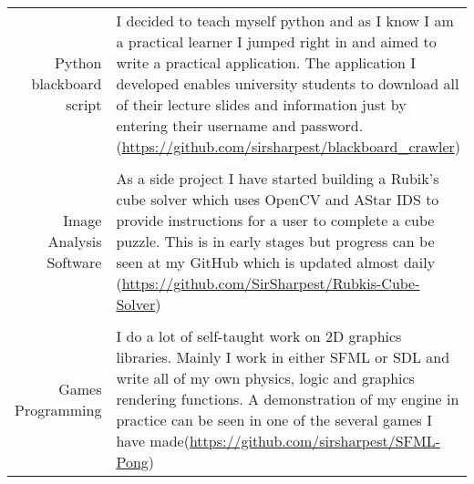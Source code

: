 \documentclass[a4paper,10pt]{article}
\begin{document}
\begin{tabular}{r|p{11cm}}
Python blackboard script& I decided to teach myself python and as I know I am a practical learner I jumped right in and aimed to write a practical application. The application I developed enables university students to download all of their lecture slides and information just by entering their username and password.(\href{https://github.com/sirsharpest/blackboard\_crawler}{https://github.com/sirsharpest/blackboard\_crawler})\\
\\
 Image Analysis Software& As a side project I have started building a Rubik's cube solver which uses OpenCV and AStar IDS to provide instructions for a user to complete a cube puzzle. This is in early stages but progress can be seen at my GitHub which is updated almost daily (\href{https://github.com/SirSharpest/Rubkis-Cube-Solver}{https://github.com/SirSharpest/Rubkis-Cube-Solver})\\
 \\
Games Programming& I do a lot of self-taught work on 2D graphics libraries. Mainly I work in either SFML or SDL and write all of my own physics, logic and graphics rendering functions. A demonstration of my engine in practice can be seen in one of the several games I have made(\href{https://github.com/sirsharpest/SFML-Pong}{https://github.com/sirsharpest/SFML-Pong})
\end{tabular}
\par 
\clearpage
\end{document}
